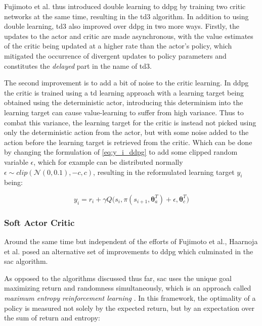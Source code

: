 \documentclass[../report.tex]{subfiles}
\begin{document}
Fujimoto et al. thus introduced double learning to \ac{ddpg} by training two critic networks at the same time, resulting in the \ac{td3} algorithm. In addition to using double learning, \ac{td3} also improved over \ac{ddpg} in two more ways. Firstly, the updates to the actor and critic are made asynchronous, with the value estimates of the critic being updated at a higher rate than the actor's policy, which mitigated the occurrence of divergent updates to policy parameters and constitutes the \textit{delayed} part in the name of \ac{td3}. 

The second improvement is to add a bit of noise to the critic learning. In \ac{ddpg} the critic is trained using a \ac{td} learning approach with a learning target being obtained using the deterministic actor, introducing this determinism into the learning target can cause value-learning to suffer from high variance. Thus to combat this variance, the learning target for the critic is instead not picked using only the deterministic action from the actor, but with some noise added to the action before the learning target is retrieved from the critic. Which can be done by changing the formulation of \autoref{eq:y_i_ddpg} to add some clipped random variable $\epsilon$, which for example can be distributed normally $\epsilon \sim clip(\mathcal{N}(0, 0.1), -c, c)$, resulting in the reformulated learning target $y_i$ being:

\begin{equation}
    y_i = r_i + \gamma Q\big(s_i, \pi(s_{i+1}, \boldsymbol{\theta}^T_a) + \epsilon, \boldsymbol{\theta}^T_c\big)
\end{equation}

\subsubsection{Soft Actor Critic}

Around the same time but independent of the efforts of Fujimoto et al., Haarnoja et al. \cite{sac} posed an alternative set of improvements to \ac{ddpg} which culminated in the \ac{sac} algorithm. 

As opposed to the algorithms discussed thus far, \ac{sac} uses the unique goal maximizing return and randomness simultaneously, which is an approach called \textit{maximum entropy reinforcement learning} \cite{maximum_entropy}. In this framework, the optimality of a policy is measured not solely by the expected return, but by an expectation over the sum of return and entropy:
\end{document}
